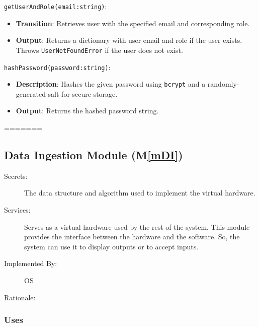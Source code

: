 \documentclass[12pt, titlepage]{article}
\newcommand{\mref}[1]{M\ref{#1}}
\begin{document}
\begin{description}
\begin{description}
  \item
  \texttt{getUserAndRole(email:string)}:
  \item
  \begin{itemize}
    \item \textbf{Transition}: Retrieves user with the specified email and
    corresponding role.
  \end{itemize}
  \item
  \begin{itemize}
    \item \textbf{Output}: Returns a dictionary with user email and role if the user exists. Throws \texttt{UserNotFoundError} if the user does not exist.
  \end{itemize}

  \item[Local Function:]
  \item
  \texttt{hashPassword(password:string)}:
  \item
  \begin{itemize}
    \item \textbf{Description}: Hashes the given password using \texttt{bcrypt}
    and a randomly-generated salt for secure storage.
  \end{itemize}
  \item 
  \begin{itemize}
    \item \textbf{Output}: Returns the hashed password string.
  \end{itemize}
=======
\subsection{Data Ingestion Module (\mref{mDI})}
\begin{description}
  \item[Secrets:]The data structure and algorithm used to implement the virtual
    hardware.
  \item[Services:]Serves as a virtual hardware used by the rest of the
    system. This module provides the interface between the hardware and the
    software. So, the system can use it to display outputs or to accept inputs.
  \item[Implemented By:] OS
  \item[Rationale:] 
\end{description}

\subsubsection{Uses}


\end{description}
\end{description}
\end{document}
